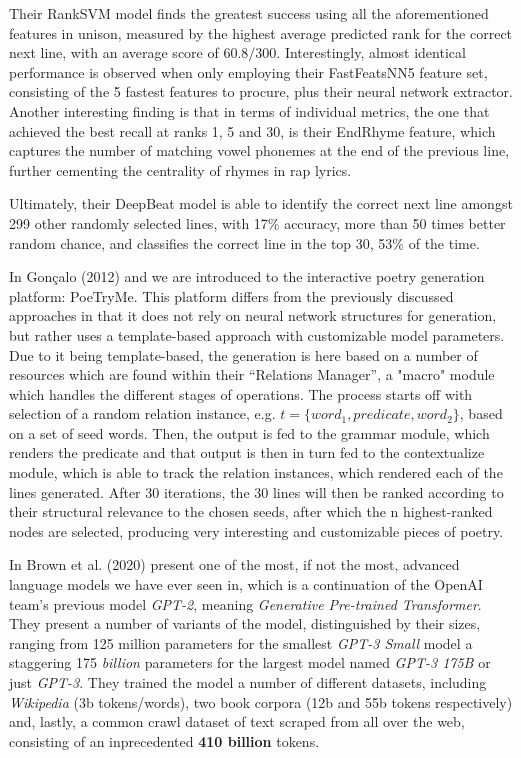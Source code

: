 Their RankSVM model finds the greatest success using all the aforementioned features in unison, measured by the highest average predicted rank for the correct next line, with an average score of $60.8/300$. Interestingly, almost identical performance is observed when only employing their FastFeatsNN5 feature set, consisting of the 5 fastest features to procure, plus their neural network extractor. Another interesting finding is that in terms of individual metrics, the one that achieved the best recall at ranks 1, 5 and 30, is their EndRhyme feature, which captures the number of matching vowel phonemes at the end of the previous line, further cementing the centrality of rhymes in rap lyrics.

Ultimately, their DeepBeat model is able to identify the correct next line amongst 299 other randomly selected lines, with 17\% accuracy, more than 50 times better random chance, and classifies the correct line in the top 30, 53\% of the time.

In Gonçalo (2012) \cite{Goncalo2012PoeTryMe} and \cite{GoncaloOliveiraHugo2014PGwP} we are introduced to the interactive poetry generation platform: PoeTryMe. This platform differs from the previously discussed approaches in that it does not rely on neural network structures for generation, but rather uses a template-based approach with customizable model parameters. Due to it being template-based, the generation is here based on a number of resources which are found within their “Relations Manager”, a "macro" module which handles the different stages of operations. The process starts off with selection of a random relation instance, e.g. $t=\{word_1,predicate,word_2\}$, based on a set of seed words. Then, the output is fed to the grammar module, which renders the predicate and that output is then in turn fed to the contextualize module, which is able to track the relation instances, which rendered each of the lines generated. After 30 iterations, the 30 lines will then be ranked according to their structural relevance to the chosen seeds, after which the n highest-ranked nodes are selected, producing very interesting and customizable pieces of poetry.

In Brown et al. (2020) \cite{BrownTomB2020LMaF} present one of the most, if not the most, advanced language models we have ever seen in, which is a continuation of the OpenAI team's previous model \textit{GPT-2}, meaning \textit{Generative Pre-trained Transformer}. They present a number of variants of the model, distinguished by their sizes, ranging from 125 million parameters for the smallest \textit{GPT-3 Small} model a staggering 175 \textit{billion} parameters for the largest model named \textit{GPT-3 175B} or just \textit{GPT-3}. They trained the model a number of different datasets, including \textit{Wikipedia} (3b tokens/words), two book corpora (12b and 55b tokens respectively) and, lastly, a common crawl dataset of text scraped from all over the web, consisting of an inprecedented \textbf{410 billion} tokens.

